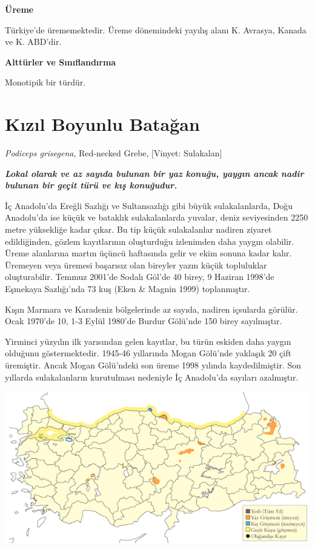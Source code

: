 \documentclass[
  letterpaper,
  DIV=11,
  numbers=noendperiod]{scrreprt}
\begin{document}
\textbf{Üreme}

Türkiye'de ürememektedir. Üreme dönemindeki yayılış alanı K. Avrasya,
Kanada ve K. ABD'dir.

\textbf{Alttürler ve Sınıflandırma}

Monotipik bir türdür.

\section{Kızıl Boyunlu Batağan}\label{kux131zux131l-boyunlu-bataux11fan}

\emph{Podiceps grisegena}, Red-necked Grebe, {[}Vinyet: Sulakalan{]}

\textbf{\emph{Lokal olarak ve az sayıda bulunan bir yaz konuğu, yaygın
ancak nadir bulunan bir geçit türü ve kış konuğudur.}}

İç Anadolu'da Ereğli Sazlığı ve Sultansazlığı gibi büyük sulakalanlarda,
Doğu Anadolu'da ise küçük ve bataklık sulakalanlarda yuvalar, deniz
seviyesinden 2250 metre yüksekliğe kadar çıkar. Bu tip küçük
sulakalanlar nadiren ziyaret edildiğinden, gözlem kayıtlarının
oluşturduğu izlenimden daha yaygın olabilir. Üreme alanlarına martın
üçüncü haftasında gelir ve ekim sonuna kadar kalır. Üremeyen veya
üremesi başarısız olan bireyler yazın küçük topluluklar oluşturabilir.
Temmuz 2001'de Sodalı Göl'de 40 birey, 9 Haziran 1998'de Eşmekaya
Sazlığı'nda 73 kuş (Eken \& Magnin 1999) toplanmıştır.

Kışın Marmara ve Karadeniz bölgelerinde az sayıda, nadiren içsularda
görülür. Ocak 1970'de 10, 1-3 Eylül 1980'de Burdur Gölü'nde 150 birey
sayılmıştır.

Yirminci yüzyılın ilk yarısından gelen kayıtlar, bu türün eskiden daha
yaygın olduğunu göstermektedir. 1945-46 yıllarında Mogan Gölü'nde
yaklaşık 20 çift üremiştir. Ancak Mogan Gölü'ndeki son üreme 1998
yılında kaydedilmiştir. Son yıllarda sulakalanların kurutulması
nedeniyle İç Anadolu'da sayıları azalmıştır.

\includegraphics{images/harita_Page_052.png}
\end{document}
